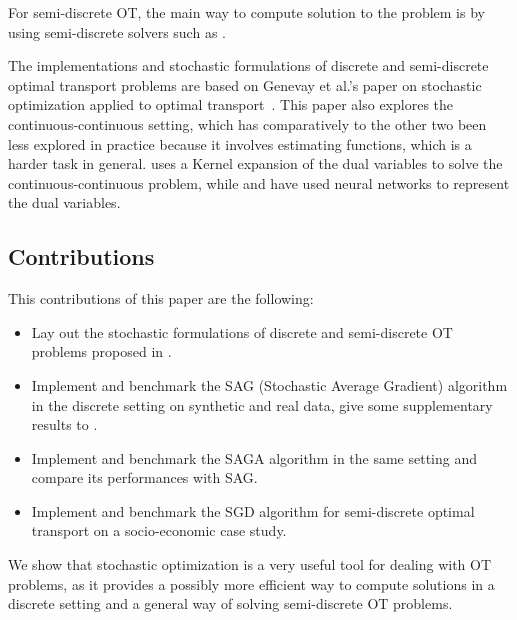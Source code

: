 For semi-discrete OT, the main way to compute solution to the problem is by using semi-discrete solvers such as \cite{aurenhammer_minkowski-type_1998}.

The implementations and stochastic formulations of discrete and semi-discrete optimal transport problems are based on Genevay et al.'s paper on stochastic optimization applied to optimal transport \cite{genevay_stochastic_2016}. This paper also explores the continuous-continuous setting, which has comparatively to the other two been less explored in practice because it involves estimating functions, which is a harder task in general. \cite{genevay_stochastic_2016} uses a Kernel expansion of the dual variables to solve the continuous-continuous problem, while \cite{arjovsky_wasserstein_2017} and \cite{seguy_large-scale_2017} have used neural networks to represent the dual variables.

\subsection{Contributions}
This contributions of this paper are the following: 
\begin{itemize}
    \item Lay out the stochastic formulations of discrete and semi-discrete OT problems proposed in \cite{genevay_stochastic_2016}.
    \item Implement and benchmark the SAG (Stochastic Average Gradient) algorithm \cite{schmidt_minimizing_2013} in the discrete setting on synthetic and real data, give some supplementary results to \cite{genevay_stochastic_2016}.
    \item Implement and benchmark the SAGA algorithm \cite{defazio_saga:_2014} in the same setting and compare its performances with SAG.
    \item Implement and benchmark the SGD algorithm for semi-discrete optimal transport on a socio-economic case study.
\end{itemize}
We show that stochastic optimization is a very useful tool for dealing with OT problems, as it provides a possibly more efficient way to compute solutions in a discrete setting and a general way of solving semi-discrete OT problems.
